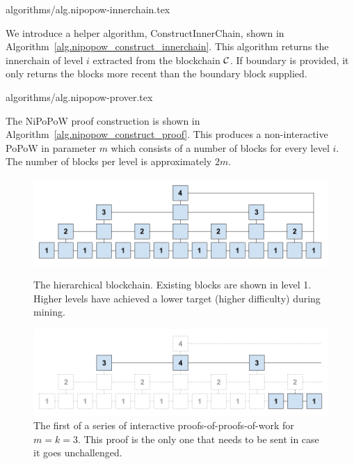 \documentclass[11pt]{llncs}
\begin{document}
{algorithms/alg.nipopow-innerchain.tex}

We introduce a helper algorithm, ConstructInnerChain, shown in
Algorithm~\ref{alg.nipopow_construct_innerchain}. This algorithm returns the innerchain
of level $i$ extracted from the blockchain $\mathcal{C}$. If boundary is provided,
it only returns the blocks more recent than the boundary block supplied.

{algorithms/alg.nipopow-prover.tex}

The NiPoPoW proof construction is shown in Algorithm~\ref{alg.nipopow_construct_proof}.
This produces a non-interactive PoPoW in parameter $m$ which consists of a
number of blocks for every level $i$. The number of blocks per level is
approximately $2m$.

\begin{figure}[h]
    \caption{The hierarchical blockchain. Existing blocks are shown in level 1.
    Higher levels have achieved a lower target (higher difficulty) during mining.}
    \centering
    \includegraphics[width=\textwidth,keepaspectratio]{figures/hierarchical-ledger.png}
    \label{fig:hierarchy}
\end{figure}

\begin{figure}[h]
    \caption{The first of a series of interactive proofs-of-proofs-of-work for
    $m = k = 3$. This proof is the only one that needs to be sent in case it
    goes unchallenged.}
    \centering
    \includegraphics[width=\textwidth,keepaspectratio]{figures/interactive-popow.png}
\end{figure}
\end{document}

